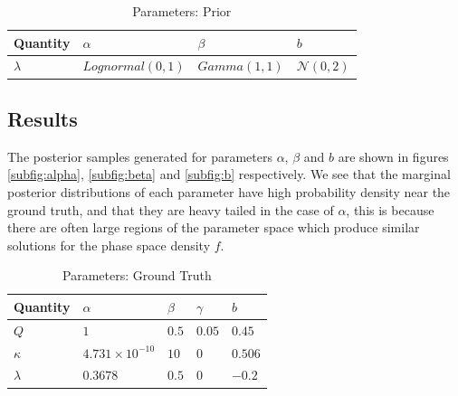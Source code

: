 \documentclass{article}
\begin{document}
\begin{table}[t]
  \caption{Parameters: Prior}
  \label{tab:prior}
  \centering
  \begin{tabular}{llll}
    \toprule
    \cmidrule{1-2}
    Quantity     & $\alpha$     & $\beta$ & $b$ \\
    \midrule
    $\lambda$ & $Lognormal(0, 1)$ & $Gamma(1, 1)$ & $\mathcal{N}(0, 2)$ \\
    \bottomrule
  \end{tabular}
\end{table}


\subsection*{Results}

The posterior samples generated for parameters $\alpha$, $\beta$ and $b$ are shown
in figures \ref{subfig:alpha}, \ref{subfig:beta} and \ref{subfig:b} respectively. We see that
the marginal posterior distributions of each parameter have high probability 
density near the ground truth, and that they are heavy tailed in the case of $\alpha$, 
this is because there are often large regions of the parameter space which produce similar
solutions for the phase space density $f$. 

\begin{table}[t]
  \caption{Parameters: Ground Truth}
  \label{tab:ground-truth}
  \centering
  \begin{tabular}{lllll}
    \toprule
    \cmidrule{1-2}
    Quantity     & $\alpha$     & $\beta$ & $\gamma$ & $b$ \\
    \midrule
    $Q$ & $1$  & $0.5$ & $0.05$  & $0.45$     \\
    $\kappa$  & $4.731 \times 10^{-10}$ & $10$  & $0$ & $0.506$ \\
    $\lambda$ & $0.3678$ & $0.5$  & $0$ & $-0.2$ \\
    \bottomrule
  \end{tabular}
\end{table}
\end{document}

